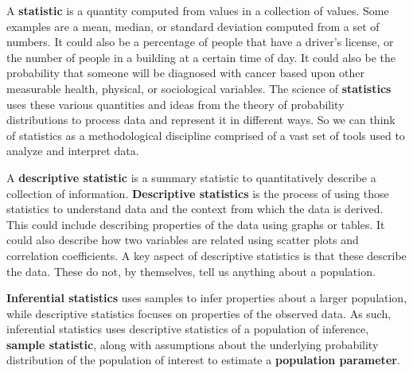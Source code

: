 \documentclass[
]{book}
\theoremstyle{definition}
\theoremstyle{definition}
\theoremstyle{definition}
\theoremstyle{definition}
\theoremstyle{remark}
\begin{document}
A \textbf{statistic} is a quantity computed from values in a collection of values. Some examples are a mean, median, or standard deviation computed from a set of numbers. It could also be a percentage of people that have a driver's license, or the number of people in a building at a certain time of day. It could also be the probability that someone will be diagnosed with cancer based upon other measurable health, physical, or sociological variables. The science of \textbf{statistics} uses these various quantities and ideas from the theory of probability distributions to process data and represent it in different ways. So we can think of statistics as a methodological discipline comprised of a vast set of tools used to analyze and interpret data.

A \textbf{descriptive statistic} is a summary statistic to quantitatively describe a collection of information. \textbf{Descriptive statistics} is the process of using those statistics to understand data and the context from which the data is derived. This could include describing properties of the data using graphs or tables. It could also describe how two variables are related using scatter plots and correlation coefficients. A key aspect of descriptive statistics is that these describe the data. These do not, by themselves, tell us anything about a population.

\textbf{Inferential statistics} uses samples to infer properties about a larger population, while descriptive statistics focuses on properties of the observed data. As such, inferential statistics uses descriptive statistics of a population of inference, \textbf{sample statistic}, along with assumptions about the underlying probability distribution of the population of interest to estimate a \textbf{population parameter}.
\end{document}
